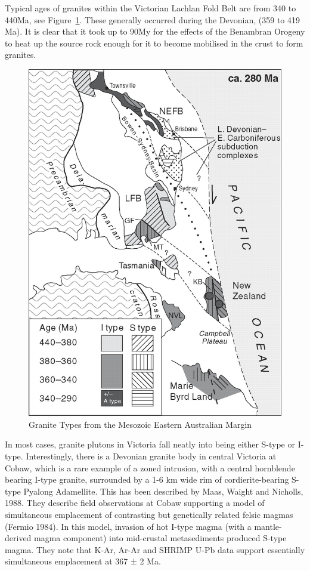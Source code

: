 \documentclass[a4paper]{article}
\begin{document}
Typical ages of granites within the Victorian Lachlan Fold Belt are from 340 to 440Ma, see  Figure~\ref{fig:GraniteTypes}. These generally occurred during the Devonian, (359 to 419 Ma). It is clear that it took up to 90My for the effects of the Benambran Orogeny to heat up the source rock enough for it to become mobilised in the crust to form granites.


\begin{figure}[H]
\centering
\includegraphics[width=1\textwidth]{Granite_Types_from_the_Eastern_Australian_Margin.jpg}
\caption{\label{fig:GraniteTypes} Granite Types from the Mesozoic Eastern Australian Margin}
\end{figure}

In most cases, granite plutons in Victoria fall neatly into being either S-type or I-type. Interestingly, there is a Devonian granite body in central Victoria at Cobaw, which is a rare example of a zoned intrusion, with a central hornblende bearing I-type granite, surrounded by a 1-6 km wide rim of cordierite-bearing S-type Pyalong Adamellite. This has been described by Maas, Waight and Nicholls, 1988. They describe field observations at Cobaw supporting a model of simultaneous emplacement of contrasting but genetically related felsic magmas (Fermio 1984). In this model, invasion of hot I-type magma (with a mantle-derived magma component) into mid-crustal metasediments produced S-type magma. They note that K-Ar, Ar-Ar and SHRIMP U-Pb data support essentially simultaneous emplacement at 367 ± 2 Ma.
\end{document}
